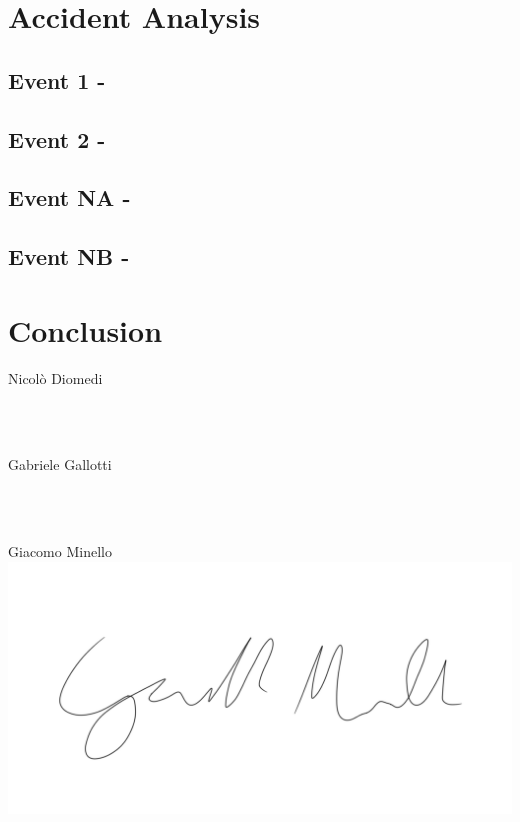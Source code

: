 \documentclass[12pt]{article}
\begin{document}
\section{Accident Analysis}
    \subsection{Event 1 - }
    \subsection{Event 2 - }
    
    
    \subsection{Event NA - }
    \subsection{Event NB - }
    
\section{Conclusion}


\begin{flushright}
Nicolò Diomedi
\end{flushright}
\\~\\
\begin{flushright}
Gabriele Gallotti
\end{flushright}
\\~\\
\begin{flushright}
Giacomo Minello\\
\includegraphics[scale=0.06]{figures/firmaMinello.png}
\end{flushright}

\newpage
\printbibliography[heading=bibintoc]
\end{document}
